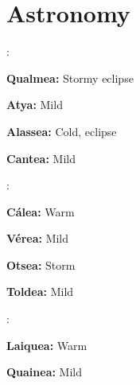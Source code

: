 
\renewcommand{\headingtype}{APPENDIX}

\chapter{Astronomy}\label{astronomy}\label{seasons}
\setcounter{list}{0}\setcounter{enc}{0}

\begin{multicols}{2}

\begin{tcolorbox}
\begin{list}{\addtocounter{enc}{1} \bf Cycle }{}

\item :

\begin{list}{\addtocounter{list}{1}}{}

\item \textbf{Qualmea:}  Stormy eclipse

\item \textbf{Atya:}  Mild

\item \textbf{Alassea:}  Cold, eclipse

\item \textbf{Cantea:}  Mild
\end{list}

\item :

\begin{list}{\addtocounter{list}{1}}{}
\item \textbf{C\'{a}lea:}  Warm

\item \textbf{V\'{e}rea:}  Mild

\item \textbf{Otsea:}  Storm

\item \textbf{Toldea:}  Mild

\end{list}

\item :

\begin{list}{\addtocounter{list}{1}}{}

\item \textbf{Laiquea:}  Warm

\item \textbf{Quainea:}  Mild


\end{list}
\end{list}
\end{tcolorbox}
\end{multicols}
